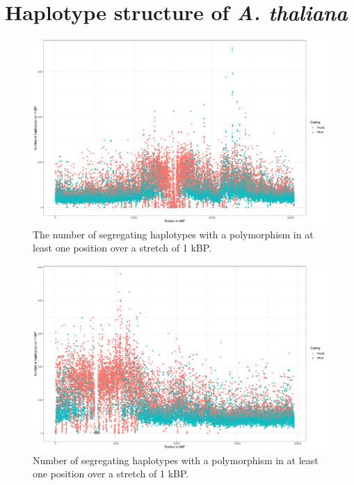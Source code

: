 \section{Haplotype structure of \textit{A. thaliana}} \label{haplo:str}

\begin{figure}[th]
\centering
\includegraphics[height=.55\textheight, width=1.1\textwidth]{Figures/chr1_hap}
\decoRule
\caption[Haplotype strutcture of chromosome 1 of \textit{A. thaliana}]{The number of segregating haplotypes with a polymorphism in at least one position over a stretch of 1 kBP.}
\label{fig:chr1}
\end{figure}



\begin{figure}[th]
\centering
\includegraphics[height=.55\textheight, width=1.1\textwidth]{Figures/chr2_hap}
\decoRule
\caption[Haplotype strutcture of chromosome 2 of \textit{A. thaliana}]{Number of segregating haplotypes with a polymorphism in at least one position over a stretch of 1 kBP. }
\label{fig:chr2}
\end{figure}


